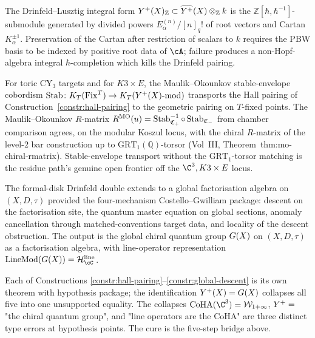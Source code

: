\begin{construction}
\label{constr:integral-form}
The Drinfeld--Lusztig integral form
$Y^{+}(X)_{\mathbb Z}\subset \widehat{Y^{+}}(X)\otimes_{\mathbb Z}k$
is the $\mathbb Z[\hbar,\hbar^{-1}]$-submodule generated by divided
powers $E_\alpha^{(n)}/[n]_q!$ of root vectors and Cartan
$K_\alpha^{\pm 1}$. Preservation of the Cartan after restriction of
scalars to $k$ requires the PBW basis to be indexed by positive root
data of $\cA$; failure produces a non-Hopf-algebra integral
$\hbar$-completion which kills the Drinfeld pairing.
\end{construction}

\begin{construction}
\label{constr:stable-envelope}
For toric CY$_3$ targets and for $K3\times E$, the Maulik--Okounkov
stable-envelope cobordism
$\operatorname{Stab}\colon K_T(\mathrm{Fix}^T)\to K_T(Y^{+}(X)\text{-mod})$
transports the Hall pairing of
Construction~\ref{constr:hall-pairing} to the geometric pairing on
$T$-fixed points. The Maulik--Okounkov $R$-matrix
$R^{\mathrm{MO}}(u) = \operatorname{Stab}^{-1}_{\mathfrak C_+}\circ
\operatorname{Stab}_{\mathfrak C_-}$ from chamber comparison agrees, on the modular
Koszul locus, with the chiral $R$-matrix of the level-$2$ bar
construction up to $\mathrm{GRT}_1(\mathbb Q)$-torsor (Vol~III,
Theorem~\textup{thm:mo-chiral-rmatrix}). Stable-envelope transport
without the $\mathrm{GRT}_1$-torsor matching is the residue path's
genuine open frontier off the $\C^{3}, K3\times E$ locus.
\end{construction}

\begin{construction}
\label{constr:global-descent}
The formal-disk Drinfeld double extends to a global factorisation
algebra on $(X, D, \tau)$ provided the four-mechanism
Costello--Gwilliam package: descent on the factorisation site, the
quantum master equation on global sections, anomaly cancellation
through matched-conventions target data, and locality of the descent
obstruction. The output is the global chiral quantum group $G(X)$ on
$(X, D, \tau)$ as a factorisation algebra, with line-operator
representation $\mathrm{LineMod}(\GX) = \Hbar^{\mathrm{line}}_\cC$.
\end{construction}

\begin{remark}
\label{rem:level-4-drinfeld-double-collapse}
Each of \textup{Constructions \ref{constr:hall-pairing}--\ref{constr:global-descent}} is its own theorem with hypothesis package; the
identification $Y^{+}(X) = G(X)$ collapses all five into one
unsupported equality. The collapses $\mathrm{CoHA}(\C^3) = \mathcal
W_{1+\infty}$, $Y^{+} = $ "the chiral quantum group", and
"line operators are the CoHA" are three distinct type errors at
hypothesis points. The cure is the five-step bridge above.
\end{remark}

